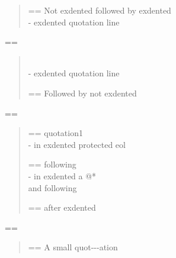 \documentclass{book}
\makeatletter
\newenvironment{GNUTexinfopreformatted}{%
  \par\GNUTobeylines\obeyspaces\frenchspacing
  \parskip=\z@\parindent=\z@}{}
{\catcode`\^^M=13 \gdef\GNUTobeylines{\catcode`\^^M=13 \def^^M{\null\par}}}
\newenvironment{GNUTexinfoindented}
  {\begin{list}{}{}
  \item\relax}
  {\end{list}}
\makeatother
\begin{document}
\begin{GNUTexinfoindented}
\begin{quote}
\begin{GNUTexinfopreformatted}%
\ttfamily Not exdented followed by exdented
\end{GNUTexinfopreformatted}
\leavevmode{}\\
\hbox{\kern -\leftmargin}%
exdented quotation line
\\
\end{quote}
\begin{GNUTexinfopreformatted}%
\ttfamily 
\end{GNUTexinfopreformatted}
\begin{quote}
\leavevmode{}\\
\hbox{\kern -\leftmargin}%
exdented quotation line
\\
\begin{GNUTexinfopreformatted}%
\ttfamily Followed by not exdented 
\end{GNUTexinfopreformatted}
\end{quote}
\begin{GNUTexinfopreformatted}%
\ttfamily 
\end{GNUTexinfopreformatted}
\begin{quote}
\begin{GNUTexinfopreformatted}%
\ttfamily quotation1
\end{GNUTexinfopreformatted}
\leavevmode{}\\
\hbox{\kern -\leftmargin}%
in exdented protected eol \ {}
\\
\begin{GNUTexinfopreformatted}%
\ttfamily following
\end{GNUTexinfopreformatted}
\leavevmode{}\\
\hbox{\kern -\leftmargin}%
in exdented a @* \leavevmode{}\\ and following
\\
\begin{GNUTexinfopreformatted}%
\ttfamily after exdented
\end{GNUTexinfopreformatted}
\end{quote}
\begin{GNUTexinfopreformatted}%
\ttfamily 
\end{GNUTexinfopreformatted}
\begin{quote}
\begin{footnotesize}
\begin{GNUTexinfopreformatted}%
\ttfamily A small quot{-}{-}{-}ation
\end{GNUTexinfopreformatted}
\end{footnotesize}

\end{quote}
\end{GNUTexinfoindented}
\end{document}

